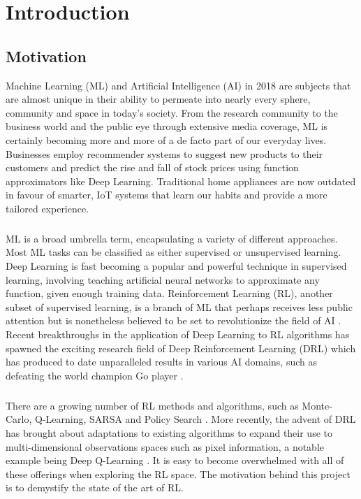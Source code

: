 \chapter{Introduction}

\section{Motivation}
Machine Learning (ML) and Artificial Intelligence (AI) in 2018 are subjects that are almost unique in their ability to permeate into nearly every sphere, community and space in today's society. From the research community to the business world and the public eye through extensive media coverage, ML is certainly becoming more and more of a de facto part of our everyday lives. Businesses employ recommender systems to suggest new products to their customers and predict the rise and fall of stock prices using function approximators like Deep Learning. Traditional home appliances are now outdated in favour of smarter, IoT systems that learn our habits and provide a more tailored experience. \paragraph{}

ML is a broad umbrella term, encapsulating a variety of different approaches. Most ML tasks can be classified as either supervised or unsupervised learning. Deep Learning is fast becoming a popular and powerful technique in supervised learning, involving teaching artificial neural networks to approximate any function, given enough training data. Reinforcement Learning (RL), another subset of supervised learning, is a branch of ML that perhaps receives less public attention but is nonetheless believed to be set to revolutionize the field of AI \citet{survey-drl}. Recent breakthroughs in the application of Deep Learning to RL algorithms has spawned the exciting research field of Deep Reinforcement Learning (DRL) which has produced to date unparalleled results in various AI domains, such as defeating the world champion Go player \citet{44806}. \paragraph{}

There are a growing number of RL methods and algorithms, such as Monte-Carlo, Q-Learning, SARSA and Policy Search \citet{sutton1998reinforcement}. More recently, the advent of DRL has brought about adaptations to existing algorithms to expand their use to multi-dimensional observations spaces such as pixel information, a notable example being Deep Q-Learning \citet{deepmind1}. It is easy to become overwhelmed with all of these offerings when exploring the RL space. The motivation behind this project is to demystify the state of the art of RL. \paragraph{}

